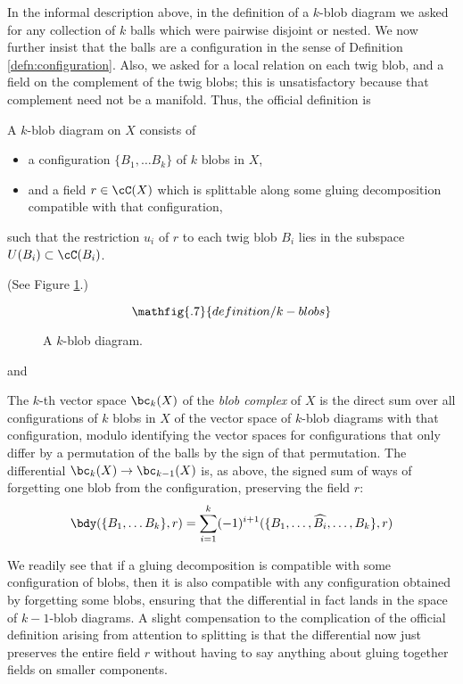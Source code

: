 In the informal description above, in the definition of a $k$-blob diagram we asked for any collection of $k$ balls which were pairwise disjoint or nested. We now further insist that the balls are a configuration in the sense of Definition \ref{defn:configuration}. Also, we asked for a local relation on each twig blob, and a field on the complement of the twig blobs; this is unsatisfactory because that complement need not be a manifold. Thus, the official definition is
\begin{defn}
\label{defn:blob-diagram}
A $k$-blob diagram on $X$ consists of
\begin{itemize}
\item a configuration $\{B_1, \ldots B_k\}$ of $k$ blobs in $X$,
\item and a field $r \in \cC(X)$ which is splittable along some gluing decomposition compatible with that configuration,
\end{itemize}
such that
the restriction $u_i$ of $r$ to each twig blob $B_i$ lies in the subspace $U(B_i) \subset \cC(B_i)$.
\end{defn}
(See Figure \ref{blobkdiagram}.)
\begin{figure}[t]\begin{equation*}
\mathfig{.7}{definition/k-blobs}
\end{equation*}\caption{A $k$-blob diagram.}\label{blobkdiagram}\end{figure}
and
\begin{defn}
\label{defn:blobs}
The $k$-th vector space $\bc_k(X)$ of the \emph{blob complex} of $X$ is the direct sum over all configurations of $k$ blobs in $X$ of the vector space of $k$-blob diagrams with that configuration, modulo identifying the vector spaces for configurations that only differ by a permutation of the balls by the sign of that permutation. The differential $\bc_k(X) \to \bc_{k-1}(X)$ is, as above, the signed sum of ways of forgetting one blob from the configuration, preserving the field $r$:
\begin{equation*}
\bdy(\{B_1, \ldots B_k\}, r) = \sum_{i=1}^{k} (-1)^{i+1} (\{B_1, \ldots, \widehat{B_i}, \ldots, B_k\}, r)
\end{equation*}
\end{defn}
We readily see that if a gluing decomposition is compatible with some configuration of blobs, then it is also compatible with any configuration obtained by forgetting some blobs, ensuring that the differential in fact lands in the space of $k{-}1$-blob diagrams.
A slight compensation to the complication of the official definition arising from attention to splitting is that the differential now just preserves the entire field $r$ without having to say anything about gluing together fields on smaller components.

